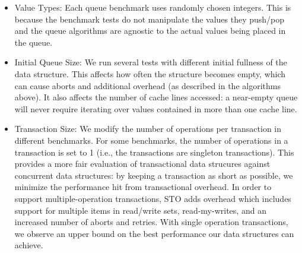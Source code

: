 \begin{itemize}
\item Value Types: Each queue benchmark uses randomly chosen integers. This is because the benchmark tests do not manipulate the values they push/pop and the queue algorithms are agnostic to the actual values being placed in the queue.

\item Initial Queue Size: We run several tests with different initial fullness of the data structure. This affects how often the structure becomes empty, which can cause aborts and additional overhead (as described in the algorithms above). It also affects the number of cache lines accessed: a near-empty queue will never require iterating over values contained in more than one cache line.

\item Transaction Size: We modify the number of operations per transaction in different benchmarks. For some benchmarks, the number of operations in a transaction is set to 1 (i.e., the transactions are singleton transactions). This provides a more fair evaluation of transactional data strucures against concurrent data structures: by keeping a transaction as short as possible, we minimize the performance hit from transactional overhead. In order to support multiple-operation transactions, STO adds overhead which includes support for multiple items in read/write sets, read-my-writes, and an increased number of aborts and retries. With single operation transactions, we observe an upper bound on the best performance our data structures can achieve.

\end{itemize}

